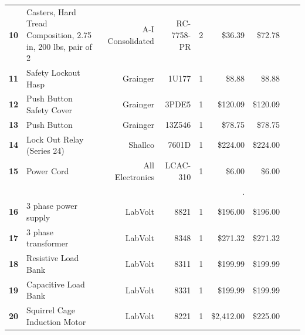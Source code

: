 \begin{table}[!htp]
{\begin{tabular}{llrrrrrrr}
      \textbf{10}    & Casters, Hard Tread Composition, 2.75 in, 200 lbs, pair of 2                     & A-I Consolidated  & RC-7758-PR        & 2        & \$36.39  & \$72.78        \\
      \textbf{11}    & Safety Lockout Hasp                                                              & Grainger          & 1U177             & 1        & \$8.88   & \$8.88         \\
      \textbf{12}    & Push Button Safety Cover                                                         & Grainger          & 3PDE5             & 1        & \$120.09 & \$120.09       \\
      \textbf{13}    & Push Button                                                                      & Grainger          & 13Z546            & 1        & \$78.75  & \$78.75        \\
      \textbf{14}    & Lock Out Relay (Series 24)                                                       & Shallco           & 7601D             & 1        & \$224.00 & \$224.00       \\
      \textbf{15}    & Power Cord                                                                       & All Electronics   & LCAC-310          & 1        & \$6.00   & \$6.00         \\
      \textbf{}      &                                                                                  &                   &                   &          & .        &                \\
      \textbf{16}    & 3 phase power supply                                                             & LabVolt           & 8821              & 1        & \$196.00 & \$196.00       \\
      \textbf{17}    & 3 phase transformer                                                              & LabVolt           & 8348              & 1        & \$271.32 & \$271.32       \\
      \textbf{18}    & Resistive Load Bank                                                              & LabVolt           & 8311              & 1        & \$199.99 & \$199.99       \\
      \textbf{19}    & Capacitive Load Bank                                                             & LabVolt           & 8331              & 1        & \$199.99 & \$199.99       \\
      \textbf{20}    & Squirrel Cage Induction Motor                                                    & LabVolt           & 8221              & 1        & \$2,412.00 & \$225.00       \\

\end{tabular}}
\end{table}
